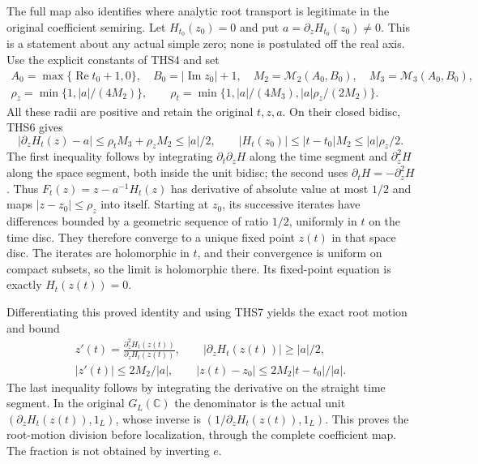 The full map also identifies where analytic root transport is
legitimate in the original coefficient semiring. Let
$H_{t_0}(z_0)=0$ and put $a=\partial_zH_{t_0}(z_0)\ne0$.
This is a statement about any actual simple zero; none is
postulated off the real axis. Use the explicit constants of
THS4 and set
\begin{equation}\tag{HDT10}
\begin{gathered}
 A_0=\max\{\operatorname{Re}t_0+1,0\},\quad
 B_0=|\operatorname{Im}z_0|+1,\quad
 M_2=\mathcal M_2(A_0,B_0),\quad M_3=\mathcal M_3(A_0,B_0),\\
 \rho_z=\min\{1,|a|/(4M_2)\},\qquad
 \rho_t=\min\{1,|a|/(4M_3),|a|\rho_z/(2M_2)\}.
\end{gathered}
\end{equation}
All these radii are positive and retain the original $t,z,a$.
On their closed bidisc, THS6 gives
\[
 |\partial_zH_t(z)-a|
 \le\rho_tM_3+\rho_zM_2\le |a|/2,
 \qquad |H_t(z_0)|\le|t-t_0|M_2\le |a|\rho_z/2.
\]
The first inequality follows by integrating $\partial_t\partial_zH$
along the time segment and $\partial_z^2H$ along the space
segment, both inside the unit bidisc; the second uses
$\partial_tH=-\partial_z^2H$. Thus
$F_t(z)=z-a^{-1}H_t(z)$ has derivative of absolute value at
most $1/2$ and maps $|z-z_0|\le\rho_z$ into itself.
Starting at $z_0$, its successive iterates have differences
bounded by a geometric sequence of ratio $1/2$, uniformly in
$t$ on the time disc. They therefore converge to a unique
fixed point $z(t)$ in that space disc. The iterates are
holomorphic in $t$, and their convergence is uniform on
compact subsets, so the limit is holomorphic there. Its
fixed-point equation is exactly $H_t(z(t))=0$.

Differentiating this proved identity and using THS7 yields
the exact root motion and bound
\begin{equation}\tag{HDT11}
\begin{gathered}
 z'(t)=\frac{\partial_z^2H_t(z(t))}{\partial_zH_t(z(t))},
 \qquad |\partial_zH_t(z(t))|\ge |a|/2,\\
 |z'(t)|\le 2M_2/|a|,\qquad
 |z(t)-z_0|\le 2M_2|t-t_0|/|a|.
\end{gathered}
\end{equation}
The last inequality follows by integrating the derivative on
the straight time segment. In the original $G_L(\mathbb C)$
the denominator is the actual unit
$(\partial_zH_t(z(t)),1_L)$, whose inverse is
$(1/\partial_zH_t(z(t)),1_L)$. This proves the root-motion
division before localization, through the complete coefficient
map. The fraction is not obtained by inverting $e$.


